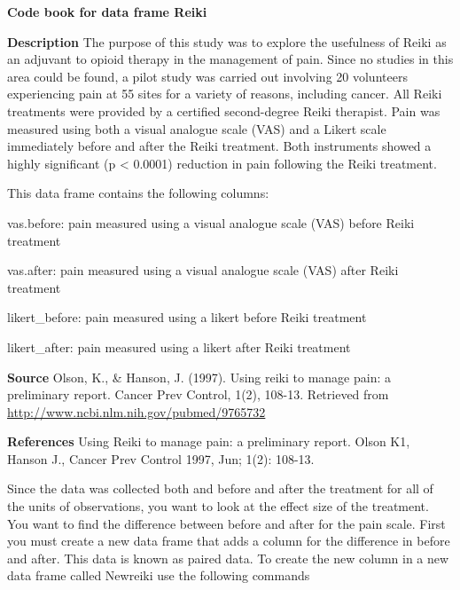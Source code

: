 \documentclass[]{book}
\newenvironment{Shaded}{\begin{snugshade}}{\end{snugshade}}
\newcommand{\DataTypeTok}[1]{\textcolor[rgb]{0.13,0.29,0.53}{#1}}
\newcommand{\KeywordTok}[1]{\textcolor[rgb]{0.13,0.29,0.53}{\textbf{#1}}}
\newcommand{\NormalTok}[1]{#1}
\newcommand{\OperatorTok}[1]{\textcolor[rgb]{0.81,0.36,0.00}{\textbf{#1}}}
\newcommand{\StringTok}[1]{\textcolor[rgb]{0.31,0.60,0.02}{#1}}
\begin{document}
\textbf{Code book for data frame Reiki}

\textbf{Description}
The purpose of this study was to explore the usefulness of Reiki as an adjuvant to opioid therapy in the management of pain. Since no studies in this area could be found, a pilot study was carried out involving 20 volunteers experiencing pain at 55 sites for a variety of reasons, including cancer. All Reiki treatments were provided by a certified second-degree Reiki therapist. Pain was measured using both a visual analogue scale (VAS) and a Likert scale immediately before and after the Reiki treatment. Both instruments showed a highly significant (p \textless{} 0.0001) reduction in pain following the Reiki treatment.

This data frame contains the following columns:

vas.before: pain measured using a visual analogue scale (VAS) before Reiki treatment

vas.after: pain measured using a visual analogue scale (VAS) after Reiki treatment

likert\_before: pain measured using a likert before Reiki treatment

likert\_after: pain measured using a likert after Reiki treatment

\textbf{Source}
Olson, K., \& Hanson, J. (1997). Using reiki to manage pain: a preliminary report. Cancer Prev Control, 1(2), 108-13. Retrieved from \url{http://www.ncbi.nlm.nih.gov/pubmed/9765732}

\textbf{References}
Using Reiki to manage pain: a preliminary report. Olson K1, Hanson J., Cancer Prev Control 1997, Jun; 1(2): 108-13.

Since the data was collected both and before and after the treatment for all of the units of observations, you want to look at the effect size of the treatment. You want to find the difference between before and after for the pain scale. First you must create a new data frame that adds a column for the difference in before and after. This data is known as paired data. To create the new column in a new data frame called Newreiki use the following commands

\begin{Shaded}
\end{Shaded}
\end{document}
